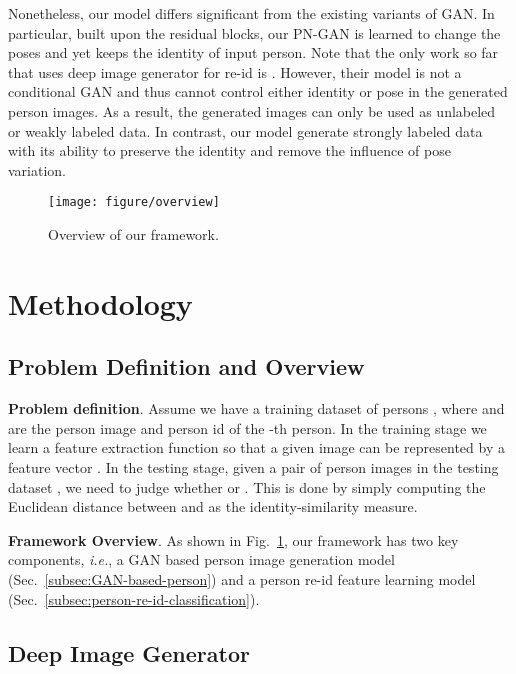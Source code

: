 \documentclass[10pt,letterpaper,twocolumn,10pt,letterpaper,twocolumn]{article}
\begin{document}
Nonetheless, our model differs significant from the existing variants of GAN. In particular,  built upon
the residual blocks, our PN-GAN is learned to change the poses and
yet keeps the identity of input person. Note that the only work so
far that uses deep image generator for re-id is \cite{zheng2017unlabeled}.
However, their model is not a conditional GAN and thus cannot
control either identity or pose in the generated person images. As
a result, the generated images can only be used as unlabeled or weakly
labeled data. In contrast, our model generate strongly labeled data
with its ability to preserve the identity and remove the influence
of pose variation.

\begin{figure}
\begin{centering}
\texttt{[image: figure/overview]}
\par\end{centering}
\caption{\label{fig:Overview} Overview of our framework.}
\end{figure}

\vspace{-0.5cm}
\section{Methodology}

\subsection{Problem Definition and Overview\label{subsec:Problem-Setup-and}}

\noindent \textbf{Problem definition}. Assume we have a training dataset
of  persons ,
where  and  are the person image and person
id of the -th person. In the training stage we learn a feature
extraction function  so that a given image  can
be represented by a feature vector .
In the testing stage, given a pair of person images 
in the testing dataset , we need to judge whether
 or . This is done by simply computing
the Euclidean distance between  and
 as the identity-similarity measure.

\noindent \textbf{Framework Overview}. As shown in Fig.~\ref{fig:Overview},
our framework has two key components, \emph{i.e.}, a GAN based person
image generation model (Sec.~\ref{subsec:GAN-based-person}) and
a person re-id feature learning model (Sec.~\ref{subsec:person-re-id-classification}).

\subsection{Deep Image Generator\label{subsec:GAN-based-person}}
\end{document}
